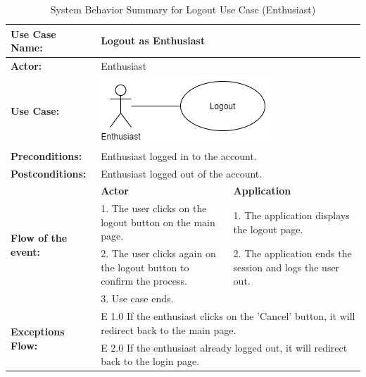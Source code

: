 \begin{longtable}{|p{3cm}|p{5cm}|p{5cm}|}
    \caption{System Behavior Summary for Logout Use Case (Enthusiast)} \\
    \hline
    \textbf{Use Case Name:} & \multicolumn{2}{l|}{Logout as Enthusiast} \\ \hline
    \textbf{Actor:} & \multicolumn{2}{l|}{Enthusiast} \\ \hline
    \textbf{Use Case:} & \multicolumn{2}{l|}{\includegraphics[width=0.5\linewidth]{mainmatter/images/sucd12.png}} \\ \hline
    \textbf{Preconditions:} & \multicolumn{2}{p{10cm}|}{Enthusiast logged in to the account.} \\ \hline
    \textbf{Postconditions:} & \multicolumn{2}{p{10cm}|}{Enthusiast logged out of the account.} \\ \hline
    \multirow{4}{3cm}{\raggedright \textbf{Flow of the event:}} & \textbf{Actor} & \textbf{Application} \\ \cline{2-3}
    & 1. The user clicks on the logout button on the main page. & 1. The application displays the logout page. \\ \cline{2-3}
    & 2. The user clicks again on the logout button to confirm the process. & 2. The application ends the session and logs the user out.  \\ \cline{2-3}
    & 3. Use case ends. &  \\ \hline
    \multirow{2}{3cm}{\raggedright \textbf{Exceptions Flow:}} & \multicolumn{2}{p{10cm}|}{\raggedright E 1.0 If the enthusiast clicks on the 'Cancel' button, it will redirect back to the main page.} \\ \cline{2-3}
    & \multicolumn{2}{p{10cm}|}{\raggedright E 2.0 If the enthusiast already logged out, it will redirect back to the login page.} \\ \hline
\end{longtable}
\pagebreak

